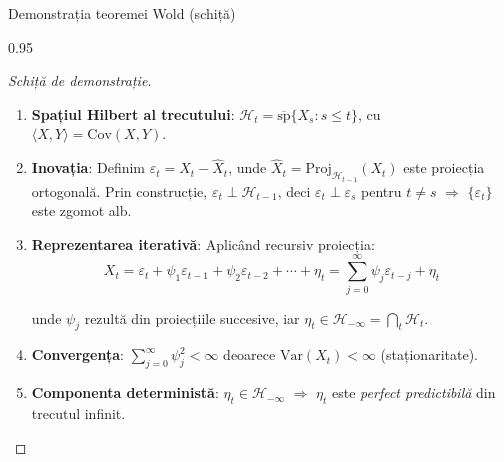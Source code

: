 \documentclass[9pt, aspectratio=169, t]{beamer}
\begin{document}
\begin{frame}{Demonstrația teoremei Wold (schiță)}
    \begin{cminipage}{0.95\textwidth}
        {\footnotesize
        \begin{proof}[\footnotesize Schiță de demonstrație]
            \vspace{-1mm}
            \begin{enumerate}\setlength{\itemsep}{1pt}
                \item \textbf{Spațiul Hilbert al trecutului}: $\mathcal{H}_t = \overline{\mathrm{sp}}\{X_s : s \leq t\}$, cu $\langle X, Y \rangle = \mathrm{Cov}(X,Y)$.

                \item \textbf{Inovația}: Definim $\varepsilon_t = X_t - \hat{X}_t$, unde $\hat{X}_t = \mathrm{Proj}_{\mathcal{H}_{t-1}}(X_t)$ este proiecția ortogonală. Prin construcție, $\varepsilon_t \perp \mathcal{H}_{t-1}$, deci $\varepsilon_t \perp \varepsilon_s$ pentru $t \neq s$ $\Rightarrow$ $\{\varepsilon_t\}$ este zgomot alb.

                \item \textbf{Reprezentarea iterativă}: Aplicând recursiv proiecția:
                \vspace{-1mm}
                \[
                    X_t = \varepsilon_t + \psi_1 \varepsilon_{t-1} + \psi_2 \varepsilon_{t-2} + \cdots + \eta_t = \sum_{j=0}^{\infty} \psi_j \varepsilon_{t-j} + \eta_t
                \]
                \vspace{-3mm}

                unde $\psi_j$ rezultă din proiecțiile succesive, iar $\eta_t \in \mathcal{H}_{-\infty} = \bigcap_{t} \mathcal{H}_t$.

                \item \textbf{Convergența}: $\sum_{j=0}^{\infty} \psi_j^2 < \infty$ deoarece $\mathrm{Var}(X_t) < \infty$ (staționaritate).

                \item \textbf{Componenta deterministă}: $\eta_t \in \mathcal{H}_{-\infty}$ $\Rightarrow$ $\eta_t$ este \textit{perfect predictibilă} din trecutul infinit.\qedhere
            \end{enumerate}
        \end{proof}
        }
    \end{cminipage}
\end{frame}
\end{document}
